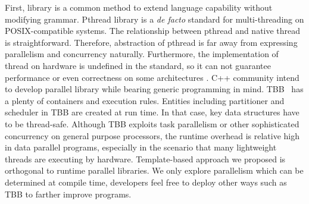 \documentclass[10pt, conference, compsocconf]{IEEEtran}
\begin{document}
First, library is a common method to extend language capability
without modifying grammar. Pthread library is a \textit{de facto} standard for
multi-threading on POSIX-compatible systems. The relationship between
pthread and native thread is straightforward. Therefore, abstraction
of pthread is far away from expressing parallelism and concurrency
naturally. Furthermore, the implementation of thread on hardware is
undefined in the standard, so it can not guarantee performance or even
correctness on some architectures \cite{Boehm05}. C++ community intend to develop parallel library while bearing
generic programming in mind. TBB~\cite{tbb} has a plenty of
containers and execution rules. Entities including partitioner and
scheduler in TBB are created at run time. In that case, key data
structures have to be thread-safe. Although TBB exploits task
parallelism or other sophisticated concurrency on general purpose
processors, the runtime overhead is relative high in data parallel
programs, especially in the scenario that many lightweight threads are
executing by hardware. Template-based approach we proposed is orthogonal to runtime parallel
libraries. We only explore parallelism which can be determined at
compile time, developers feel free to deploy other ways such as TBB to
farther improve programs.
 

\end{document}
